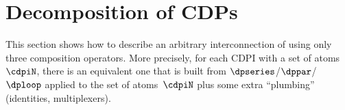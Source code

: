 
\section{Decomposition of CDPs}
\label{sec:Decomposition}


\label{sec:Decomposing2}
This section shows how to describe an arbitrary interconnection of  using only three composition operators.
More precisely, for each CDPI with a set of atoms~$\cdpiN$, there is an equivalent one that is built from $\dpseries$/$\dppar$/$\dploop$ applied to the set of atoms~$\cdpiN$ plus some extra ``plumbing'' (identities, multiplexers).




